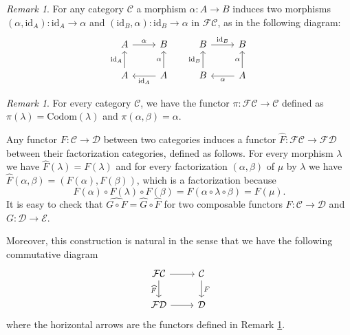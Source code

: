 \documentclass[12pt,reqno]{amsart}
\theoremstyle{definition}
\theoremstyle{remark}
\newtheorem{rem}[teo]{Remark}
\numberwithin{figure}{section}%
\newcommand{\CC}{\mathcal{C}}
\newcommand{\Dc}{\mathcal{D}}
\newcommand{\E}{\mathcal{E}}
\newcommand{\F}{\mathcal{F}}
\newcommand{\id}{\mathrm{id}}
\begin{document}
\begin{rem}\label{IDENT}
For any category $\CC$ a morphism $\alpha\colon A \rightarrow B$ induces two morphisms $(\alpha,\id_A)\colon\id_A \rightarrow \alpha$ and $(\id_B,\alpha)\colon\id_B \rightarrow \alpha$ in $\F \CC$, as in the following diagram:
$$
\begin{tikzcd}
A \arrow[r, "\alpha"] & B                                        & B \arrow[r, "\id_B"] & B                                         \\
A \arrow[u, "\id_A"]  & A \arrow[u, "\alpha"] \arrow[l, "\id_A"] & B \arrow[u, "\id_B"] & A \arrow[l, "\alpha"] \arrow[u, "\alpha"]
\end{tikzcd}
$$\end{rem}
\begin{rem}\label{ARROW}
    For every category $\CC$, we have the functor $\pi\colon\F \CC \rightarrow \CC$ defined as $\pi(\lambda)=\mathrm{Codom}(\lambda)$ and $\pi(\alpha,\beta)=\alpha$.
\end{rem}
Any functor $F\colon \CC \rightarrow \Dc$ between two categories induces a functor 
     $\widehat{F}\colon \F \CC \rightarrow \F \Dc$  between their factorization categories, defined as follows. For every morphism $\lambda$ we have  $\widehat{F}(\lambda)=F(\lambda)$ and for every factorization $(\alpha,\beta)$ of $\mu$ by $\lambda$ we have  $\widehat{F}(\alpha,\beta)=(F(\alpha),F(\beta))$, which is a factorization because $$F(\alpha)\circ F(\lambda) \circ F(\beta)=F(\alpha \circ \lambda\circ \beta)=F(\mu).$$
     It is easy to check that  $\widehat{G \circ F}=\widehat{G} \circ \widehat{F}$ for two composable functors  $F \colon \CC \rightarrow \Dc$ and $G \colon \Dc \rightarrow \E$.
     
     Moreover, this construction is natural in the sense that we have the following commutative diagram $$
\begin{tikzcd}
\F \CC \arrow[d, "\widehat{F}"'] \arrow[r] &  \CC \arrow[d, "F"] \\
\F \Dc \arrow[r]                 & \Dc                     
\end{tikzcd}
    $$
    where the horizontal arrows  are the functors defined in Remark \ref{ARROW}.  
 
\end{document}
